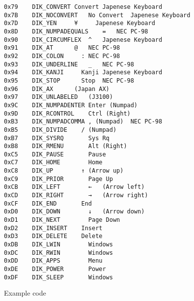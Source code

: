 \documentclass[
  openany]{book}
\begin{document}
\begin{verbatim}
0x79    DIK_CONVERT Convert Japenese Keyboard
0x7B    DIK_NOCONVERT   No Convert  Japenese Keyboard
0x7D    DIK_YEN     ¥     Japenese Keyboard
0x8D    DIK_NUMPADEQUALS    =   NEC PC-98
0x90    DIK_CIRCUMFLEX  ^   Japenese Keyboard
0x91    DIK_AT      @   NEC PC-98
0x92    DIK_COLON     : NEC PC-98
0x93    DIK_UNDERLINE   _   NEC PC-98
0x94    DIK_KANJI     Kanji Japenese Keyboard
0x95    DIK_STOP      Stop  NEC PC-98
0x96    DIK_AX      (Japan AX)  
0x97    DIK_UNLABELED   (J3100) 
0x9C    DIK_NUMPADENTER Enter (Numpad)  
0x9D    DIK_RCONTROL    Ctrl (Right)    
0xB3    DIK_NUMPADCOMMA , (Numpad)  NEC PC-98
0xB5    DIK_DIVIDE    / (Numpad)    
0xB7    DIK_SYSRQ       Sys Rq  
0xB8    DIK_RMENU       Alt (Right) 
0xC5    DIK_PAUSE       Pause   
0xC7    DIK_HOME        Home    
0xC8    DIK_UP        ↑ (Arrow up)
0xC9    DIK_PRIOR       Page Up 
0xCB    DIK_LEFT        ←   (Arrow left)
0xCD    DIK_RIGHT       →   (Arrow right)
0xCF    DIK_END       End   
0xD0    DIK_DOWN        ↓   (Arrow down)
0xD1    DIK_NEXT        Page Down   
0xD2    DIK_INSERT    Insert    
0xD3    DIK_DELETE    Delete    
0xDB    DIK_LWIN        Windows 
0xDC    DIK_RWIN        Windows 
0xDD    DIK_APPS        Menu    
0xDE    DIK_POWER       Power   
0xDF    DIK_SLEEP       Windows
\end{verbatim}

Example code
\end{document}
